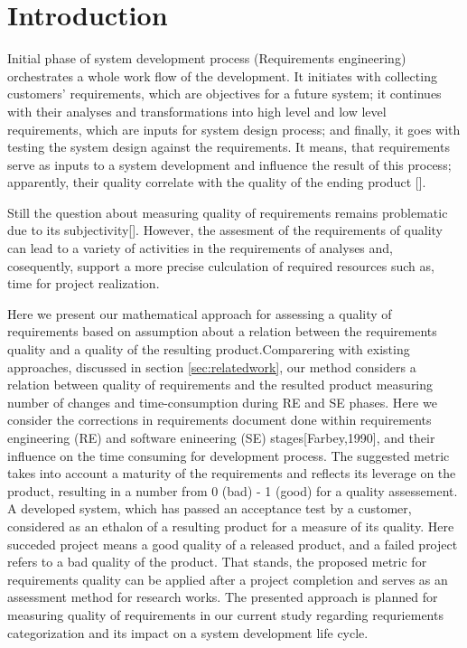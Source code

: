 \section{Introduction}
\label{sec:Intro} 
Initial phase of system development process (Requirements engineering) orchestrates a whole work flow of the development. 
It initiates with collecting customers' requirements, which are objectives for a future system; it continues with their  analyses 
and transformations into high level and low level requirements, which are inputs for system design process; 
and finally, it goes with testing the system design against the requirements. It means, that requirements serve as inputs to a system 
development and influence the result of this process; apparently, their quality correlate with the quality of the ending product [].

Still the question about measuring quality of requirements remains problematic due to its subjectivity[]. However, the assesment 
of the requirements of quality can lead to a variety of activities in the requirements of analyses and, cosequently, support 
a more precise culculation of required resources such as, time for project realization.

Here we present our mathematical approach for assessing a quality of requirements based on assumption about 
a relation between the requirements quality and a quality of the resulting product.Comparering with existing approaches, 
discussed in section \autoref{sec:relatedwork}, our method considers a relation between quality of requirements and 
the resulted product measuring number of changes and time-consumption during RE and SE phases. Here we consider 
the corrections in requirements document done within requirements engineering (RE) and software enineering (SE) stages[Farbey,1990], 
and their influence on the time consuming for development process. The suggested metric takes into account a maturity of the requirements 
and reflects its leverage on the product, resulting in a number from 0 (bad) - 1 (good) for a quality assessement. A developed system, 
which has passed an acceptance test by a customer, considered as an ethalon of a resulting product for a measure of its quality. 
Here succeded project means a good quality of a released product, and a failed project refers to a bad quality of the product. 
That stands, the proposed metric for requirements quality can be applied after a project completion and serves as an assessment method 
for research works. The presented approach is planned for measuring quality of requirements in our current study regarding requriements 
categorization and its impact on a system development life cycle.
